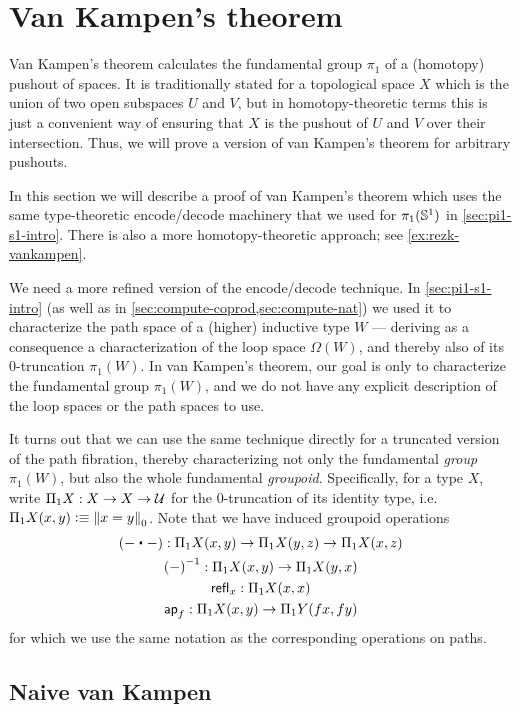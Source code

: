 \section{Van Kampen's theorem}
\label{sec:van-kampen}

Van Kampen's theorem calculates the fundamental group $\pi_1$ of a (homotopy) pushout of spaces.
It is traditionally stated for a topological space $X$ which is the union of two open subspaces $U$ and $V$, but in homotopy-theoretic terms this is just a convenient way of ensuring that $X$ is the pushout of $U$ and $V$ over their intersection.
Thus, we will prove a version of van Kampen's theorem for arbitrary pushouts.

In this section we will describe a proof of van Kampen's theorem which uses the same type-theoretic encode/decode machinery that we used for $\pi_1(\Sn^1)$ in \autoref{sec:pi1-s1-intro}.
There is also a more homotopy-theoretic approach; see \autoref{ex:rezk-vankampen}.

We need a more refined version of the encode/decode technique.
In \autoref{sec:pi1-s1-intro} (as well as in \autoref{sec:compute-coprod,sec:compute-nat}) we used it to characterize the path space of a (higher) inductive type $W$ --- deriving as a consequence a characterization of the loop space $\Omega(W)$, and thereby also of its 0-truncation $\pi_1(W)$.
In van Kampen's theorem, our goal is only to characterize the fundamental group $\pi_1(W)$, and we do not have any explicit description of the loop spaces or the path spaces to use.

It turns out that we can use the same technique directly for a truncated version of the path fibration, thereby characterizing not only the fundamental \emph{group} $\pi_1(W)$, but also the whole fundamental \emph{groupoid}.
Specifically, for a type $X$, write $\Pi_1 X: X\to X\to \type$ for the $0$-truncation of its identity type, i.e.\ $\Pi_1 X(x,y) \defeq \trunc0{x=y}$.
Note that we have induced groupoid operations
\begin{gather*}
  (-\ct-) : \Pi_1X(x,y) \to \Pi_1X(y,z) \to \Pi_1X(x,z)\\
  \opp{(-)} : \Pi_1X(x,y) \to \Pi_1X(y,x)\\
  \refl{x} : \Pi_1X(x,x)\\
  \apfunc{f} : \Pi_1X(x,y) \to \Pi_1Y(fx,fy)
\end{gather*}
for which we use the same notation as the corresponding operations on paths.


\subsection{Naive van Kampen}
\label{sec:naive-vankampen}

